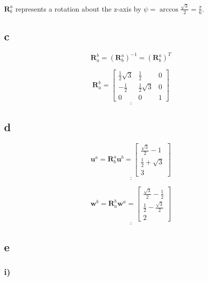 \documentclass{article}
\begin{document}
$\mathbf{R}_b^a$ represents a rotation about the z-axis by $\psi=\arccos{\frac{\sqrt{3}}{2}} = \frac{\pi}{6}$.

\subsection{c}

\begin{equation*}
    \mathbf{R}_a^b = (\mathbf{R}_b^a)^{-1} = (\mathbf{R}_b^a)^T
\end{equation*}

\begin{equation*}
    \underline{\underline{\mathbf{R}_a^b = 
    \begin{bmatrix}
    \frac{1}{2} \sqrt{3} & \frac{1}{2} & 0 \\
    -\frac{1}{2} & \frac{1}{2} \sqrt{3} & 0 \\
    0 & 0 & 1
    \end{bmatrix}}}
\end{equation*}

\subsection{d}

\begin{equation*}
    \underline{\underline{\mathbf{u}^a = \mathbf{R}_b^a\mathbf{u}^b =
    \begin{bmatrix}
    \frac{\sqrt{3}}{2} - 1\\
    \frac{1}{2}+\sqrt{3} \\
    3
    \end{bmatrix}}}
\end{equation*}


\begin{equation*}
    \underline{\underline{\mathbf{w}^b = \mathbf{R}_a^b\mathbf{w}^a =
    \begin{bmatrix}
    \frac{\sqrt{3}}{2} - \frac{1}{2}\\
    \frac{1}{2}-\frac{\sqrt{3}}{2}\\
    2
    \end{bmatrix}}}
\end{equation*}


\subsection{e}

\subsubsection*{i)}
\end{document}
